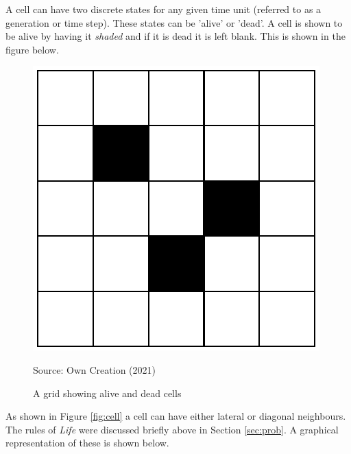 A cell can have two discrete states for any given time unit (referred to as a generation or time step). These states can be 'alive' or 'dead'. A cell is shown to be alive by having it \textsl{shaded} and if it is dead it is left blank.\citep{adamatzky2010game} This is shown in the figure below.
\begin{figure}[H]
\centering
\includegraphics[scale=0.5]{Figures/Chapter2/shaded.png}
\caption{A grid showing alive and dead cells}
\begin{center}
Source: Own Creation (2021)
\end{center}
\end{figure}
As shown in Figure \ref{fig:cell} a cell can have either lateral or diagonal neighbours. The rules of \textsl{Life} were discussed briefly above in Section \ref{sec:prob}. A graphical representation of these is shown below.
